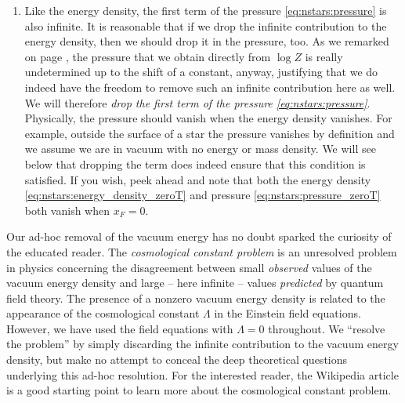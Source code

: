 \begin{enumerate}
\item
Like the energy density, the first term of the pressure \eqref{eq:nstars:pressure} is also infinite.
It is reasonable that if we drop the infinite contribution to the energy density, then we should drop it in the pressure, too.
As we remarked on page \pageref{tft:pressure_renormalization_discussion}, the pressure that we obtain directly from $\log Z$ is really undetermined up to the shift of a constant, anyway, justifying that we do indeed have the freedom to remove such an infinite contribution here as well.
We will therefore \emph{drop the first term of the pressure \eqref{eq:nstars:pressure}}.
Physically, the pressure should vanish when the energy density vanishes.
For example, outside the surface of a star the pressure vanishes by definition and we assume we are in vacuum with no energy or mass density.
We will see below that dropping the term does indeed ensure that this condition is satisfied.
If you wish, peek ahead and note that both the energy density \eqref{eq:nstars:energy_density_zeroT} and pressure \eqref{eq:nstars:pressure_zeroT} both vanish when $x_F = 0$.

\end{enumerate}

Our ad-hoc removal of the vacuum energy has no doubt sparked the curiosity of the educated reader.
The \emph{cosmological constant problem} is an unresolved problem in physics concerning the disagreement between small \emph{observed} values of the vacuum energy density and large -- here infinite -- values \emph{predicted} by quantum field theory.
The presence of a nonzero vacuum energy density is related to the appearance of the cosmological constant $\Lambda$ in the Einstein field equations.
However, we have used the field equations with $\Lambda = 0$ throughout.
We ``resolve the problem'' by simply discarding the infinite contribution to the vacuum energy density, but make no attempt to conceal the deep theoretical questions underlying this ad-hoc resolution.
For the interested reader, the Wikipedia article \cite{ref:wiki_cosmological_constant_problem} is a good starting point to learn more about the cosmological constant problem.


